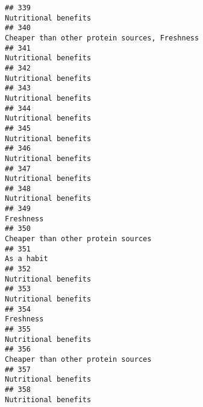 \documentclass[
]{article}
\begin{document}
\begin{verbatim}
## 339                                                                                                       Nutritional benefits
## 340                                                                              Cheaper than other protein sources, Freshness
## 341                                                                                                       Nutritional benefits
## 342                                                                                                       Nutritional benefits
## 343                                                                                                       Nutritional benefits
## 344                                                                                                       Nutritional benefits
## 345                                                                                                       Nutritional benefits
## 346                                                                                                       Nutritional benefits
## 347                                                                                                       Nutritional benefits
## 348                                                                                                       Nutritional benefits
## 349                                                                                                                  Freshness
## 350                                                                                         Cheaper than other protein sources
## 351                                                                                                                 As a habit
## 352                                                                                                       Nutritional benefits
## 353                                                                                                       Nutritional benefits
## 354                                                                                                                  Freshness
## 355                                                                                                       Nutritional benefits
## 356                                                                                         Cheaper than other protein sources
## 357                                                                                                       Nutritional benefits
## 358                                                                                                       Nutritional benefits

\end{verbatim}
\end{document}

